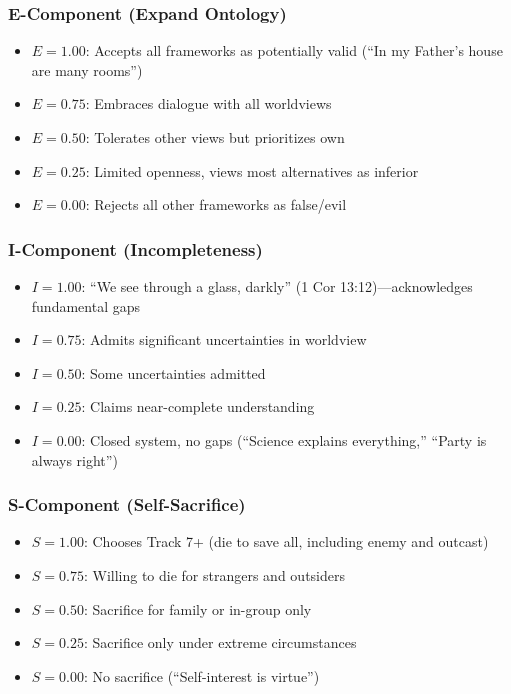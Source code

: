 \documentclass[11pt,a4paper]{article}
\theoremstyle{definition}
\theoremstyle{remark}
\begin{document}
\subsubsection{E-Component (Expand Ontology)}
\begin{itemize}
    \item $E = 1.00$: Accepts all frameworks as potentially valid (``In my Father's house are many rooms'')
    \item $E = 0.75$: Embraces dialogue with all worldviews
    \item $E = 0.50$: Tolerates other views but prioritizes own
    \item $E = 0.25$: Limited openness, views most alternatives as inferior
    \item $E = 0.00$: Rejects all other frameworks as false/evil
\end{itemize}

\subsubsection{I-Component (Incompleteness)}
\begin{itemize}
    \item $I = 1.00$: ``We see through a glass, darkly'' (1 Cor 13:12)---acknowledges fundamental gaps
    \item $I = 0.75$: Admits significant uncertainties in worldview
    \item $I = 0.50$: Some uncertainties admitted
    \item $I = 0.25$: Claims near-complete understanding
    \item $I = 0.00$: Closed system, no gaps (``Science explains everything,'' ``Party is always right'')
\end{itemize}

\subsubsection{S-Component (Self-Sacrifice)}
\begin{itemize}
    \item $S = 1.00$: Chooses Track 7+ (die to save all, including enemy and outcast)
    \item $S = 0.75$: Willing to die for strangers and outsiders
    \item $S = 0.50$: Sacrifice for family or in-group only
    \item $S = 0.25$: Sacrifice only under extreme circumstances
    \item $S = 0.00$: No sacrifice (``Self-interest is virtue'')
\end{itemize}
\end{document}
